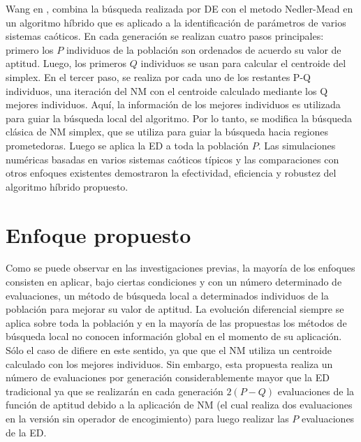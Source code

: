Wang en \cite{wang2011parameter}, combina la búsqueda realizada por DE con el metodo Nedler-Mead  en un algoritmo híbrido que es aplicado a la identificación de parámetros de varios sistemas caóticos. En cada generación se realizan cuatro pasos principales: primero los $P$ individuos de la población son ordenados de acuerdo su valor de aptitud. Luego, los primeros $Q$ individuos se usan para calcular el centroide del simplex. En el tercer paso, se realiza por cada uno de los restantes P-Q individuos, una iteración del NM con el centroide calculado mediante los Q mejores individuos. Aquí, la información de los mejores individuos es utilizada para guiar la búsqueda local del algoritmo. Por lo tanto, se modifica la búsqueda clásica de NM simplex, que se utiliza para guiar la búsqueda hacia regiones prometedoras. Luego se aplica la ED a toda la población $P$. Las simulaciones numéricas basadas en varios sistemas caóticos típicos y las comparaciones con otros enfoques existentes demostraron la efectividad, eficiencia y robustez del algoritmo híbrido propuesto. 



\section{Enfoque propuesto}\label{sec:Enfoque propuesto}
Como se puede observar en las investigaciones previas, la mayoría de los enfoques consisten en aplicar, bajo ciertas condiciones y con un número determinado de evaluaciones,  un método de búsqueda local a determinados individuos de la población para mejorar su valor de aptitud. La evolución diferencial siempre se aplica sobre toda la población y en la mayoría de las propuestas los métodos de búsqueda local no conocen información global en el momento de su aplicación. Sólo el caso de \cite{wang2011parameter} difiere en este sentido, ya que que el NM utiliza un centroide calculado con los mejores individuos. Sin embargo, esta propuesta realiza un número de evaluaciones por generación considerablemente mayor que la ED tradicional ya que se realizarán en cada generación $2(P-Q)$ evaluaciones de la función de aptitud debido a la aplicación de NM (el cual realiza dos evaluaciones en la versión sin operador de encogimiento) para luego realizar las $P$ evaluaciones de la ED. 

